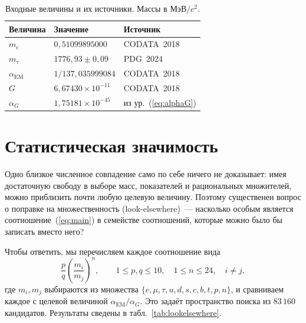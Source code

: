 \documentclass[aps,prd,twocolumn,amsmath,amssymb,floatfix,nofootinbib]{revtex4-2}
\begin{document}
\begin{table}[t]
\caption{Входные величины и их источники. Массы в
$\mathrm{МэВ}/c^2$.}
\label{tab:inputs}
\begin{ruledtabular}
\begin{tabular}{lll}
Величина & Значение & Источник \\
\hline
$m_e$ & $0{,}51099895000$ & CODATA~2018~\cite{codata2018} \\
$m_\tau$ & $1776{,}93\pm 0{,}09$ & PDG~2024~\cite{pdg2024} \\
$\alpha_{\mathrm{EM}}$ & $1/137{,}035999084$ & CODATA~2018~\cite{codata2018} \\
$G$ & $6{,}67430\times 10^{-11}$ & CODATA~2018~\cite{codata2018} \\
$\alpha_G$ & $1{,}75181\times 10^{-45}$ & из ур.~(\ref{eq:alphaG}) \\
\end{tabular}
\end{ruledtabular}
\end{table}

\section{Статистическая значимость}
\label{sec:lookelsewhere}

Одно близкое численное совпадение само по себе ничего не доказывает: имея
достаточную свободу в выборе масс, показателей и рациональных множителей,
можно приблизить почти любую целевую величину. Поэтому существенен вопрос о
поправке на множественность (look-elsewhere)~--- насколько особым является
соотношение~(\ref{eq:main}) в семействе соотношений, которые можно было бы
записать вместо него?

Чтобы ответить, мы перечисляем каждое соотношение вида
\begin{equation}
\frac{p}{q}\left(\frac{m_i}{m_j}\right)^{\!n},
\qquad
1\le p,q \le 10,\quad
1\le n \le 24,\quad
i\neq j,
\label{eq:family}
\end{equation}
где $m_i,m_j$ выбираются из множества
$\{e,\mu,\tau,u,d,s,c,b,t,p,n\}$, и сравниваем каждое с целевой величиной
$\alpha_{\mathrm{EM}}/\alpha_G$. Это задаёт пространство поиска из $83\,160$
кандидатов. Результаты сведены в табл.~\ref{tab:lookelsewhere}.
\end{document}
